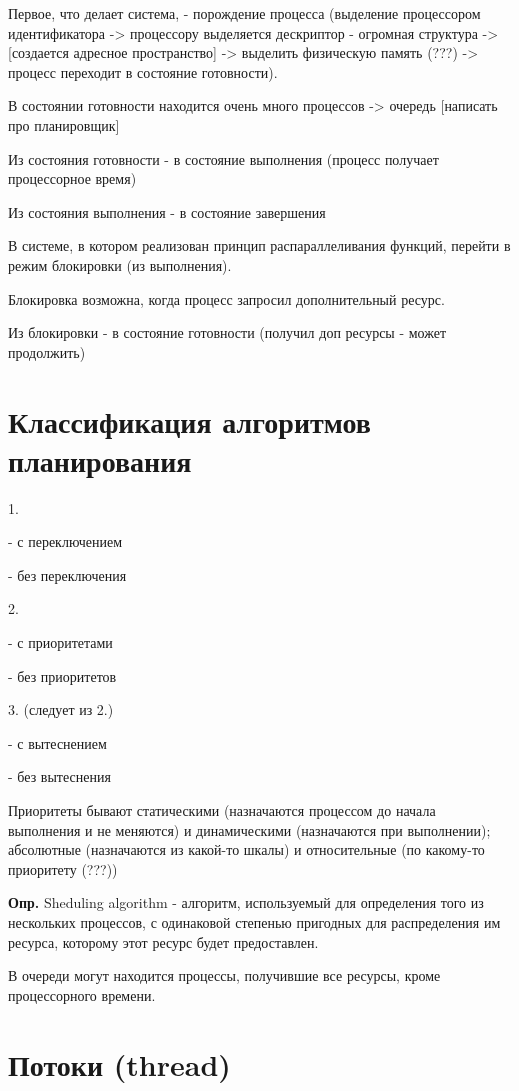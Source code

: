 \documentclass[14pt, a4paper]{article}
\begin{document}
	Первое, что делает система, - порождение процесса (выделение процессором идентификатора -> процессору выделяется дескриптор - огромная структура -> [создается адресное пространство] -> выделить физическую память (???) -> процесс переходит в состояние готовности).
	
	В состоянии готовности находится очень много процессов -> очередь [написать про планировщик]
	
	Из состояния готовности - в состояние выполнения (процесс получает процессорное время)
	
	Из состояния выполнения - в состояние завершения
	
	В системе, в котором реализован принцип распараллеливания функций, перейти в режим блокировки (из выполнения).
	
	Блокировка возможна, когда процесс запросил дополнительный ресурс.
	
	Из блокировки - в состояние готовности (получил доп ресурсы - может продолжить)
	
	\section{Классификация алгоритмов планирования}
	
	1.
	
	- с переключением
	
	- без переключения
	
	2.
	
	- с приоритетами
	
	- без приоритетов
	
	3. (следует из 2.)
	
	- с вытеснением
	
	- без вытеснения
	
	Приоритеты бывают статическими (назначаются процессом до начала выполнения и не меняются) и динамическими (назначаются при выполнении); абсолютные (назначаются из какой-то шкалы) и относительные (по какому-то приоритету (???))
	
	{\bf Опр.} Sheduling algorithm - алгоритм, используемый для определения того из нескольких процессов, с одинаковой степенью пригодных для распределения им ресурса, которому этот ресурс будет предоставлен.
	
	В очереди могут находится процессы, получившие все ресурсы, кроме процессорного времени.
	
	\section{Потоки (thread)}
	
\end{document}
